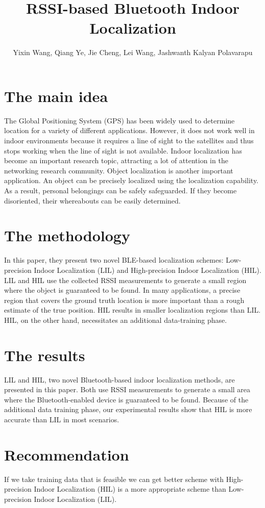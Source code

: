 \documentclass[a4paper]{article}
\title{RSSI-based Bluetooth Indoor Localization}
\author[1]{Yixin Wang, Qiang Ye, Jie Cheng, Lei Wang, Jashwanth Kalyan Polavarapu}
\begin{document}
\maketitle
\section{The main idea}

The Global Positioning System (GPS) has been widely used to determine location for a variety of different applications. However, it does not work well in indoor environments because it requires a line of sight to the satellites and thus stops working when the line of sight is not available. Indoor localization has become an important research topic, attracting a lot of attention in the networking research community. Object localization is another important application. An object can be precisely localized using the localization capability. As a result, personal belongings can be safely safeguarded. If they become disoriented, their whereabouts can be easily determined.

\section{The methodology }

In this paper, they present two novel BLE-based localization schemes: Low-precision Indoor Localization (LIL) and High-precision Indoor Localization (HIL). LIL and HIL use the collected RSSI measurements to generate a small region where the object is guaranteed to be found. In many applications, a precise region that covers the ground truth location is more important than a rough estimate of the true position. HIL results in smaller localization regions than LIL. HIL, on the other hand, necessitates an additional data-training phase.

\section{The results}
 
LIL and HIL, two novel Bluetooth-based indoor localization methods, are presented in this paper. Both use RSSI measurements to generate a small area where the Bluetooth-enabled device is guaranteed to be found. Because of the additional data training phase, our experimental results show that HIL is more accurate than LIL in most scenarios.

\section{Recommendation}

If we take training data that is feasible we can get better scheme with High-precision Indoor Localization (HIL) is a more appropriate scheme than Low-precision Indoor Localization (LIL). 
\end{document}
